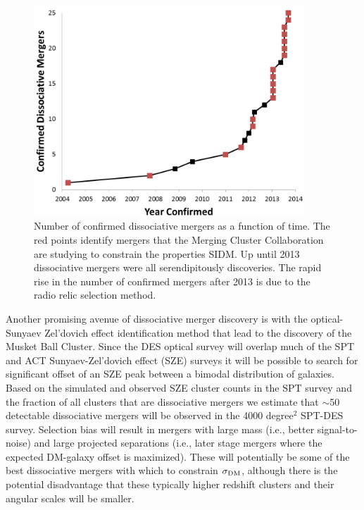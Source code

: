 \begin{figure}
\centering
\includegraphics[width=4in]{Chapter5/NumberOfConfirmedDissociativeMergers.png}
\caption[Number of confirmed dissociative mergers as a function of time.]{
Number of confirmed dissociative mergers as a function of time.
The red points identify mergers that the Merging Cluster Collaboration are studying to  constrain the properties SIDM.
Up until 2013 dissociative mergers were all serendipitously discoveries.
The rapid rise in the number of confirmed mergers after 2013 is due to the radio relic selection method.
}
\label{figure:N_Mergers}
\end{figure}

Another promising avenue of dissociative merger discovery is with the optical-Sunyaev Zel'dovich effect identification method that lead to the discovery of the Musket Ball Cluster.
Since the DES optical survey \citep{Collaboration:2005vv} will overlap much of the SPT \citep{Ruhl:2004io} and ACT \citep{Hincks:2010ff} Sunyaev-Zel'dovich effect (SZE) surveys it will be possible to search for significant offset of an SZE peak between a bimodal distribution of galaxies.
Based on the simulated and observed SZE cluster counts in the SPT survey \citep{Vanderlinde:2010hr, Song:2012tz} and the fraction of all clusters that are dissociative mergers \citep{ForeroRomero:2010cc} we estimate that $\sim$50 detectable dissociative mergers will be observed in the 4000 degree$^2$ SPT-DES survey.  Selection bias will result in mergers with large mass (i.e., better signal-to-noise) and large projected separations (i.e., later stage mergers where the expected DM-galaxy offset is maximized).  These will potentially be some of the best dissociative mergers with which to constrain $\sigma_{\rm DM}$, although there is the potential disadvantage that these typically higher redshift clusters and their angular scales will be smaller.


